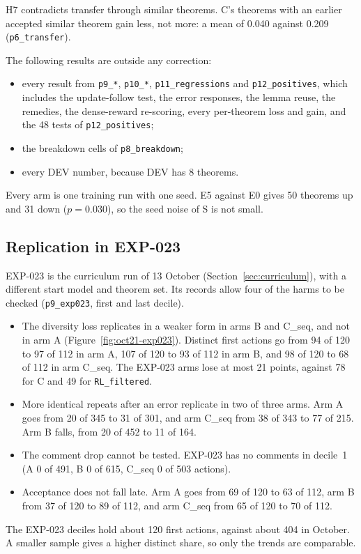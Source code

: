 \documentclass[11pt]{article}
\newcommand{\code}[1]{\texttt{#1}}
\newcommand{\pth}[1]{\nolinkurl{#1}}
\begin{document}
H7 contradicts transfer through similar theorems.
C's theorems with an earlier accepted similar theorem gain less, not more: a mean of 0.040 against 0.209 (\pth{p6_transfer}).

The following results are outside any correction:
\begin{itemize}
\item every result from \pth{p9_*}, \pth{p10_*}, \pth{p11_regressions} and \pth{p12_positives}, which includes the update-follow test, the error responses, the lemma reuse, the remedies, the dense-reward re-scoring, every per-theorem loss and gain, and the 48 tests of \pth{p12_positives};
\item the breakdown cells of \pth{p8_breakdown};
\item every DEV number, because DEV has 8 theorems.
\end{itemize}
Every arm is one training run with one seed.
E5 against E0 gives 50 theorems up and 31 down ($p = 0.030$), so the seed noise of S is not small.

\subsection{Replication in EXP-023}
\label{sec:oct21-exp023}

EXP-023 is the curriculum run of 13 October (Section~\ref{sec:curriculum}), with a different start model and theorem set.
Its records allow four of the harms to be checked (\pth{p9_exp023}, first and last decile).
\begin{itemize}
\item The diversity loss replicates in a weaker form in arms B and C\_seq, and not in arm A (Figure~\ref{fig:oct21-exp023}). Distinct first actions go from 94 of 120 to 97 of 112 in arm A, 107 of 120 to 93 of 112 in arm B, and 98 of 120 to 68 of 112 in arm C\_seq. The EXP-023 arms lose at most 21 points, against 78 for C and 49 for \code{RL\_filtered}.
\item More identical repeats after an error replicate in two of three arms. Arm A goes from 20 of 345 to 31 of 301, and arm C\_seq from 38 of 343 to 77 of 215. Arm B falls, from 20 of 452 to 11 of 164.
\item The comment drop cannot be tested. EXP-023 has no comments in decile~1 (A 0 of 491, B 0 of 615, C\_seq 0 of 503 actions).
\item Acceptance does not fall late. Arm A goes from 69 of 120 to 63 of 112, arm B from 37 of 120 to 89 of 112, and arm C\_seq from 65 of 120 to 70 of 112.
\end{itemize}
The EXP-023 deciles hold about 120 first actions, against about 404 in October. A smaller sample gives a higher distinct share, so only the trends are comparable.
\end{document}
